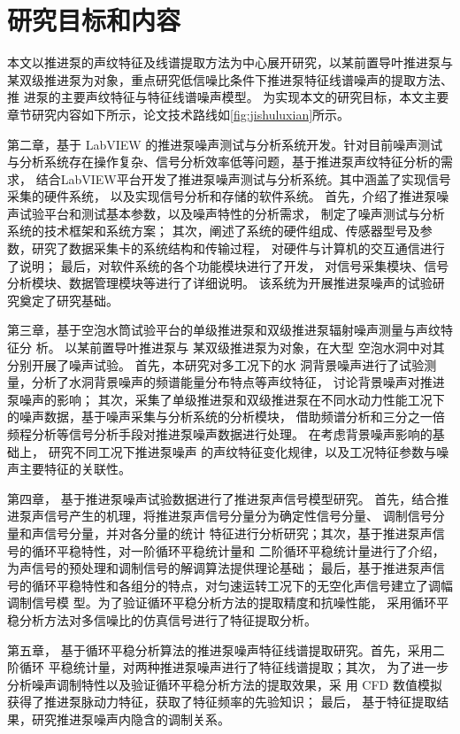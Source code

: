 \section{研究目标和内容}
本文以推进泵的声纹特征及线谱提取方法为中心展开研究，以某前置导叶推进泵与
某双级推进泵为对象，重点研究低信噪比条件下推进泵特征线谱噪声的提取方法、推
进泵的主要声纹特征与特征线谱噪声模型。
为实现本文的研究目标，本文主要章节研究内容如下所示，论文技术路线如\autoref{fig:jishuluxian}所示。

第二章，基于 LabVIEW 的推进泵噪声测试与分析系统开发。针对目前噪声测试与分析系统存在操作复杂、信号分析效率低等问题，基于推进泵声纹特征分析的需求，
结合LabVIEW平台开发了推进泵噪声测试与分析系统。其中涵盖了实现信号采集的硬件系统，
以及实现信号分析和存储的软件系统。
首先，介绍了推进泵噪声试验平台和测试基本参数，以及噪声特性的分析需求，
制定了噪声测试与分析系统的技术框架和系统方案；
其次，阐述了系统的硬件组成、传感器型号及参数，研究了数据采集卡的系统结构和传输过程，
对硬件与计算机的交互通信进行了说明；
最后，对软件系统的各个功能模块进行了开发，
对信号采集模块、信号分析模块、数据管理模块等进行了详细说明。
该系统为开展推进泵噪声的试验研究奠定了研究基础。

第三章，基于空泡水筒试验平台的单级推进泵和双级推进泵辐射噪声测量与声纹特征分
析。
以某前置导叶推进泵与
某双级推进泵为对象，在大型
空泡水洞中对其分别开展了噪声试验。
首先，本研究对多工况下的水
洞背景噪声进行了试验测量，分析了水洞背景噪声的频谱能量分布特点等声纹特征，
讨论背景噪声对推进泵噪声的影响；
其次，采集了单级推进泵和双级推进泵在不同水动力性能工况下的噪声数据，基于噪声采集与分析系统的分析模块，
借助频谱分析和三分之一倍频程分析等信号分析手段对推进泵噪声数据进行处理。
在考虑背景噪声影响的基础上，
研究不同工况下推进泵噪声
的声纹特征变化规律，以及工况特征参数与噪声主要特征的关联性。

第四章，
基于推进泵噪声试验数据进行了推进泵声信号模型研究。
首先，结合推进泵声信号产生的机理，将推进泵声信号分量分为确定性信号分量、
调制信号分量和声信号分量，并对各分量的统计
特征进行分析研究；其次，基于推进泵声信号的循环平稳特性，对一阶循环平稳统计量和
二阶循环平稳统计量进行了介绍，为声信号的预处理和调制信号的解调算法提供理论基础；
最后，基于推进泵声信号的循环平稳特性和各组分的特点，对匀速运转工况下的无空化声信号建立了调幅调制信号模
型。为了验证循环平稳分析方法的提取精度和抗噪性能，
采用循环平稳分析方法对多信噪比的仿真信号进行了特征提取分析。

第五章，
基于循环平稳分析算法的推进泵噪声特征线谱提取研究。首先，采用二阶循环
平稳统计量，对两种推进泵噪声进行了特征线谱提取；其次，
为了进一步分析噪声调制特性以及验证循环平稳分析方法的提取效果，采
用 CFD 数值模拟获得了推进泵脉动力特征，获取了特征频率的先验知识；
最后，
基于特征提取结果，研究推进泵噪声内隐含的调制关系。

